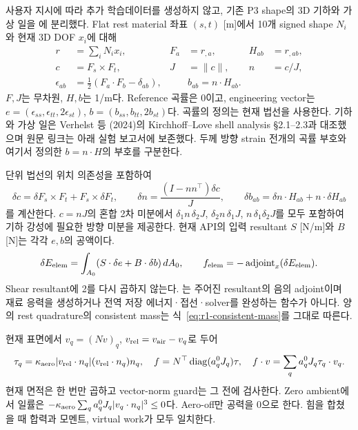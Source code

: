 \documentclass[10pt]{article}
\begin{document}
사용자 지시에 따라 추가 학습데이터를 생성하지 않고, 기존 P3 shape의 3D 기하와 가상 일을
에 분리했다. Flat rest material 좌표 \((s,t)\) [m]에서
10개 signed shape \(N_i\)와 현재 3D DOF \(x_i\)에 대해
\begin{equation}
\begin{aligned}
 r&=\sum_iN_i x_i,& F_a&=r_{,a},& H_{ab}&=r_{,ab},\\
 c&=F_s\times F_t,& J&=\|c\|,& n&=c/J,\\
 \epsilon_{ab}&=\tfrac12(F_a\cdot F_b-\delta_{ab}),&&
 b_{ab}=n\cdot H_{ab}.
\end{aligned}
\label{eq:r1-p3-surface-geometry}
\end{equation}
\(F,J\)는 무차원, \(H,b\)는 1/m다. Reference 곡률은 0이고,
engineering vector는 \(e=(\epsilon_{ss},\epsilon_{tt},2\epsilon_{st})\),
\(b=(b_{ss},b_{tt},2b_{st})\)다. 곡률의 정의는 현재 법선을 사용한다.
기하와 가상 일은 Verhelst 등 (2024)의 Kirchhoff--Love shell analysis \S2.1--2.3과
대조했으며 원문 링크는 아래 실험 보고서에 보존했다. 두께 방향 strain 전개의 곡률 부호와
여기서 정의한 \(b=n\cdot H\)의 부호를 구분한다.

단위 법선의 위치 의존성을 포함하여
\begin{equation}
 \delta c=\delta F_s\times F_t+F_s\times\delta F_t,\qquad
 \delta n=\frac{(I-nn^\top)\delta c}{J},\qquad
 \delta b_{ab}=\delta n\cdot H_{ab}+n\cdot\delta H_{ab}
 \label{eq:r1-p3-surface-variation}
\end{equation}
를 계산한다. \(c=nJ\)의 혼합 2차 미분에서
\(\delta_1n\,\delta_2J\), \(\delta_2n\,\delta_1J\),
\(n\,\delta_1\delta_2J\)를 모두 포함하여 기하 강성에 필요한 방향 미분을 제공한다.
현재 API의 입력 resultant \(S\) [N/m]와 \(B\) [N]는 각각 \(e,b\)의 공액이다.
\begin{equation}
 \delta E_{\rm elem}=\int_{A_0}(S\cdot\delta e+B\cdot\delta b)\,dA_0,
 \qquad f_{\rm elem}=-\operatorname{adjoint}_x(\delta E_{\rm elem}).
 \label{eq:r1-p3-element-virtual-work}
\end{equation}
Shear resultant에 2를 다시 곱하지 않는다. 는 주어진 resultant의 음의
adjoint이며 재료 응력을 생성하거나 전역 저장 에너지·접선·solver를 완성하는 함수가 아니다.
양의 rest quadrature의 consistent mass는 식~\eqref{eq:r1-consistent-mass}를 그대로 따른다.

현재 표면에서 \(v_q=(Nv)_q\), \(v_{\rm rel}=v_{\rm air}-v_q\)로 두어
\begin{equation}
 \tau_q=\kappa_{\rm aero}|v_{\rm rel}\cdot n_q|(v_{\rm rel}\cdot n_q)n_q,\quad
 f=N^\top\operatorname{diag}(a_q^0J_q)\tau,\quad
 f\cdot v=\sum_q a_q^0J_q\tau_q\cdot v_q.
 \label{eq:r1-p3-surface-aero}
\end{equation}
현재 면적은 한 번만 곱하고 vector-norm guard는 그 전에 검사한다.
Zero ambient에서 일률은
\(-\kappa_{\rm aero}\sum_q a_q^0J_q|v_q\cdot n_q|^3\le0\)다.
Aero-off만 공력을 0으로 한다. 힘을 합쳤을 때 합력과 모멘트, virtual work가 모두 일치한다.
\end{document}
